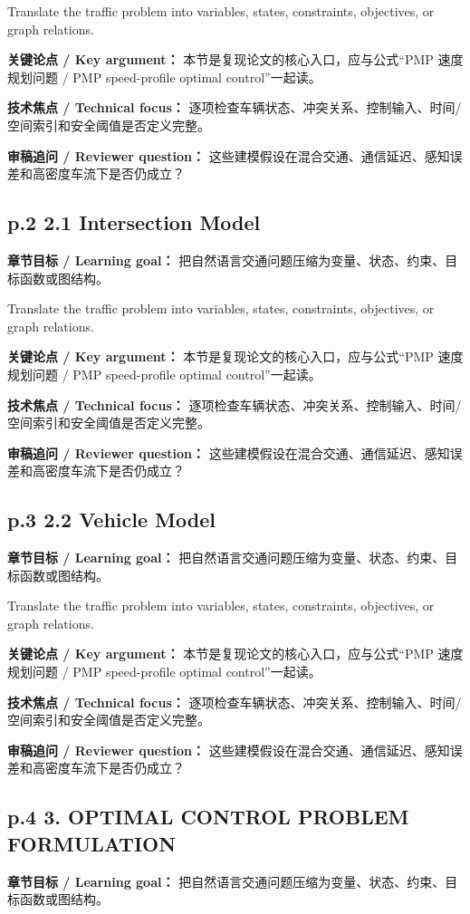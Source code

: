 \documentclass[UTF8,a4paper,11pt,fontset=fandol]{ctexart}
\begin{document}
Translate the traffic problem into variables, states, constraints, objectives, or graph relations.

\textbf{关键论点 / Key argument：} 本节是复现论文的核心入口，应与公式“PMP 速度规划问题 / PMP speed-profile optimal control”一起读。

\textbf{技术焦点 / Technical focus：} 逐项检查车辆状态、冲突关系、控制输入、时间/空间索引和安全阈值是否定义完整。

\textbf{审稿追问 / Reviewer question：} 这些建模假设在混合交通、通信延迟、感知误差和高密度车流下是否仍成立？

\subsection*{p.2 2.1 Intersection Model}
\textbf{章节目标 / Learning goal：} 把自然语言交通问题压缩为变量、状态、约束、目标函数或图结构。

Translate the traffic problem into variables, states, constraints, objectives, or graph relations.

\textbf{关键论点 / Key argument：} 本节是复现论文的核心入口，应与公式“PMP 速度规划问题 / PMP speed-profile optimal control”一起读。

\textbf{技术焦点 / Technical focus：} 逐项检查车辆状态、冲突关系、控制输入、时间/空间索引和安全阈值是否定义完整。

\textbf{审稿追问 / Reviewer question：} 这些建模假设在混合交通、通信延迟、感知误差和高密度车流下是否仍成立？

\subsection*{p.3 2.2 Vehicle Model}
\textbf{章节目标 / Learning goal：} 把自然语言交通问题压缩为变量、状态、约束、目标函数或图结构。

Translate the traffic problem into variables, states, constraints, objectives, or graph relations.

\textbf{关键论点 / Key argument：} 本节是复现论文的核心入口，应与公式“PMP 速度规划问题 / PMP speed-profile optimal control”一起读。

\textbf{技术焦点 / Technical focus：} 逐项检查车辆状态、冲突关系、控制输入、时间/空间索引和安全阈值是否定义完整。

\textbf{审稿追问 / Reviewer question：} 这些建模假设在混合交通、通信延迟、感知误差和高密度车流下是否仍成立？

\subsection*{p.4 3. OPTIMAL CONTROL PROBLEM FORMULATION}
\textbf{章节目标 / Learning goal：} 把自然语言交通问题压缩为变量、状态、约束、目标函数或图结构。
\end{document}
